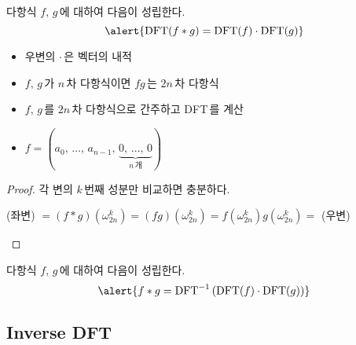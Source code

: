 \begin{frame}
    \begin{theorem}
        다항식 \(f,\, g\)\,에 대하여 다음이 성립한다.
        \vspace*{-5px}
        \[
            \alert{\DFT(f \ast g) = \DFT(f) \cdot \DFT(g)}
        \]
        \vspace*{-15px}
    \end{theorem}

    \begin{itemize}
        \setlength{\itemsep}{1em}
        \item<2-> 우변의 \(\cdot\)\,은 벡터의 내적
        \item<3-> \(f,\,g\)\,가 \(n\)\,차 다항식이면 \(fg\)\,는 \(2n\)\,차 다항식
        \item<4-> \(f,\,g\)\,를 \(2n\)\,차 다항식으로 간주하고 DFT\,를 계산
        \item<4-> \(f = (a_0,\,\dots,\,a_{n-1},\, \underbrace{0,\, \dots,\, 0}_{n\,\text{개}})\)
    \end{itemize}
\end{frame}


\begin{frame}
    \begin{proof}
        각 변의 \(k\)\,번째 성분만 비교하면 충분하다.
        \begin{center}
            (좌변) \(= (f \ast g)(\omega_{2n}^k) = (fg)(\omega_{2n}^k) = f(\omega_{2n}^k)g(\omega_{2n}^k) = \) (우변)
        \end{center}
    \end{proof}

    \pause

    \begin{corollary}
        다항식 \(f,\, g\)\,에 대하여 다음이 성립한다.
        \vspace*{-5px}
        \[
            \alert{f \ast g = \DFT\inv\left(\DFT(f) \cdot \DFT(g)\right)}
        \]
        \vspace*{-15px}
    \end{corollary}
\end{frame}

\subsection{Inverse DFT}

